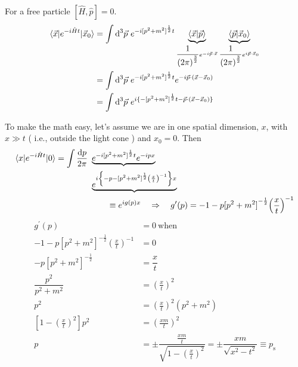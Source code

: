\documentclass{article}
\begin{document}

\noindent For a free particle $[ \hat{H}, \hat{p} ] = 0 $.
\begin{align*}
\braket{ \vec{x} | e^{ -i \hat{H} t } | \vec{x}_0 } &= \int \mathrm{d}^3 \vec{p} ~ e^{ -i {[ p^2 + m^2 ]}^\frac{1}{2} t } \underbrace{\braket{ \vec{x} | \vec{p} }}_{ \dfrac{1}{{(2 \pi)}^\frac{3}{2}} e^{ -i \vec{p} \cdot \vec{x} } } \underbrace{\braket{ \vec{p} | \vec{x}_0 }}_{ \dfrac{1}{{(2 \pi)}^\frac{3}{2}} e^{ i \vec{p} \cdot \vec{x}_0 } } \\
&= \int \mathrm{d}^3 \vec{p} ~ e^{ -i {[ p^2 + m^2 ]}^\frac{1}{2} t } e^{ -i \vec{p} \cdot ( \vec{x} - \vec{x}_0 ) } \\
&= \int \mathrm{d}^3 \vec{p} ~ e^{ i \lbrace -{[ p^2 + m^2 ]}^\frac{1}{2} t - \vec{p} \cdot ( \vec{x} - \vec{x}_0 ) \rbrace }
\end{align*}

\noindent To make the math easy, let's assume we are in one spatial dimension, $x$, with $ x \gg t $ ( i.e., outside the light cone ) and $ x_0 = 0 $.
Then
\begin{align*}
\braket{ x | e^{ -i \hat{H} t } | 0 } = \int \dfrac{\mathrm{d} p}{2 \pi} ~ & \underbrace{e^{ -i {[ p^2 + m^2 ]}^\frac{1}{2} t  } e^{ -i p x }} \\
& \underbrace{e^{ i \left\lbrace -p - {[ p^2 + m^2 ]}^\frac{1}{2} {\left( \frac{x}{t} \right)}^{-1} \right\rbrace x }} \\
&\qquad \equiv e^{ i g(p) x } \quad \Rightarrow \quad g^\prime (p) = -1 - p {[ p^2 + m^2 ]}^{ -\frac{1}{2} } {\left( \frac{x}{t} \right)}^{-1}
\end{align*}
\begin{align*}
g^\prime (p) &= 0 ~ \mathrm{when} \\
-1 - p {[ p^2 + m^2 ]}^{ -\frac{1}{2} } {\left( \frac{x}{t} \right)}^{-1} &= 0 \\
-p {[ p^2 + m^2 ]}^{ -\frac{1}{2} } &= \dfrac{x}{t} \\
\dfrac{p^2}{ p^2 + m^2 } &= {\left( \frac{x}{t} \right)}^2 \\
p^2 &= {\left( \frac{x}{t} \right)}^2 \left( p^2 + m^2 \right) \\
\left[ 1 - {\left( \frac{x}{t} \right)}^2 \right] p^2 &= {\left( \frac{ x m }{t} \right)}^2 \\
p &= \pm \dfrac{ \frac{ x m }{t} }{ \sqrt{ 1 - {\left( \frac{x}{t} \right)}^2 } } = \pm \dfrac{ x m }{ \sqrt{ x^2 - t^2 } } \equiv p_\mathrm{s}
\end{align*}
\end{document}
